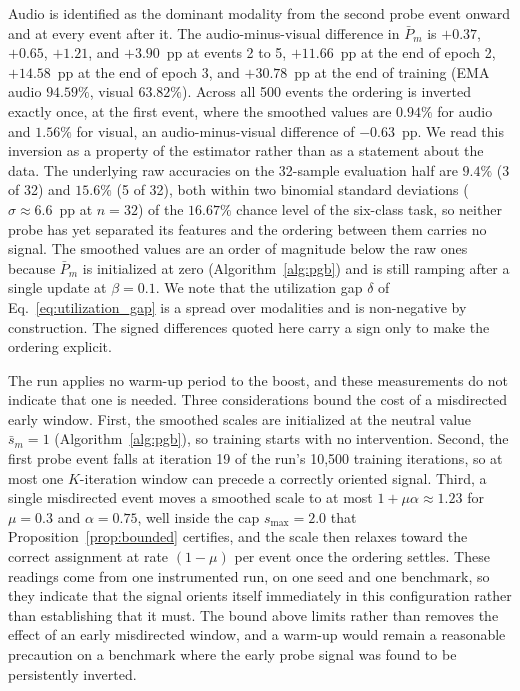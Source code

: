 \documentclass{article}
\begin{document}
Audio is identified as the dominant modality from the second probe event onward and at every event after it. The audio-minus-visual difference in $\bar{P}_m$ is $+0.37$, $+0.65$, $+1.21$, and $+3.90$~pp at events 2 to 5, $+11.66$~pp at the end of epoch 2, $+14.58$~pp at the end of epoch 3, and $+30.78$~pp at the end of training (EMA audio $94.59\%$, visual $63.82\%$). Across all 500 events the ordering is inverted exactly once, at the first event, where the smoothed values are $0.94\%$ for audio and $1.56\%$ for visual, an audio-minus-visual difference of $-0.63$~pp. We read this inversion as a property of the estimator rather than as a statement about the data. The underlying raw accuracies on the 32-sample evaluation half are $9.4\%$ (3 of 32) and $15.6\%$ (5 of 32), both within two binomial standard deviations ($\sigma \approx 6.6$~pp at $n=32$) of the $16.67\%$ chance level of the six-class task, so neither probe has yet separated its features and the ordering between them carries no signal. The smoothed values are an order of magnitude below the raw ones because $\bar{P}_m$ is initialized at zero (Algorithm~\ref{alg:pgb}) and is still ramping after a single update at $\beta = 0.1$. We note that the utilization gap $\delta$ of Eq.~\eqref{eq:utilization_gap} is a spread over modalities and is non-negative by construction. The signed differences quoted here carry a sign only to make the ordering explicit.

The run applies no warm-up period to the boost, and these measurements do not indicate that one is needed. Three considerations bound the cost of a misdirected early window. First, the smoothed scales are initialized at the neutral value $\bar{s}_m = 1$ (Algorithm~\ref{alg:pgb}), so training starts with no intervention. Second, the first probe event falls at iteration 19 of the run's 10{,}500 training iterations, so at most one $K$-iteration window can precede a correctly oriented signal. Third, a single misdirected event moves a smoothed scale to at most $1 + \mu\alpha \approx 1.23$ for $\mu = 0.3$ and $\alpha = 0.75$, well inside the cap $s_{\max} = 2.0$ that Proposition~\ref{prop:bounded} certifies, and the scale then relaxes toward the correct assignment at rate $(1-\mu)$ per event once the ordering settles. These readings come from one instrumented run, on one seed and one benchmark, so they indicate that the signal orients itself immediately in this configuration rather than establishing that it must. The bound above limits rather than removes the effect of an early misdirected window, and a warm-up would remain a reasonable precaution on a benchmark where the early probe signal was found to be persistently inverted.
\end{document}
